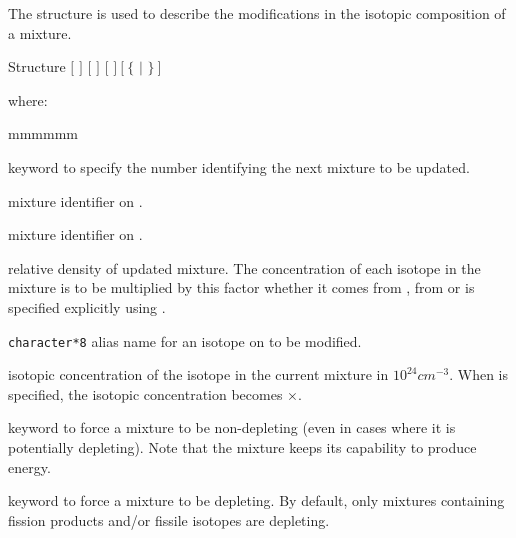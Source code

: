 \vskip 0.25cm
\goodbreak

The structure  is used to describe the modifications in the isotopic composition of a mixture.

\begin{DataStructure}{Structure }
   $[$  $]$ $[$  $]$
$[$   $]~[~\{$  $|$  $\}~]$
\end{DataStructure}

\noindent
where:

\begin{ListeDeDescription}{mmmmmm}

\item[\moc{MIX}] keyword to specify the number identifying the next mixture to
be updated.

\item[\dusa{matnum}] mixture identifier on . 

\item[\dusa{matold}] mixture identifier on .

\item[\dusa{relden}] relative density of updated mixture. The  concentration
of each isotope in the mixture is to be multiplied by this factor whether it 
comes from , from  or is
specified explicitly using . 

\item[\dusa{NAMALI}] {\tt character*8} alias name for an isotope on
 to be modified. 

\item[\dusa{dens}] isotopic concentration of the isotope  in the
current mixture in $10^{24}cm^{-3}$.  When  is specified, the
isotopic concentration becomes $\times$.

\item[\moc{NOEV}] keyword to force a mixture to be non-depleting (even in
cases where it is potentially depleting). Note that the mixture keeps its
capability to produce energy.

\item[\moc{EVOL}] keyword to force a mixture to be depleting. By default, only
mixtures containing fission products and/or fissile isotopes are depleting.

\end{ListeDeDescription}
\eject
